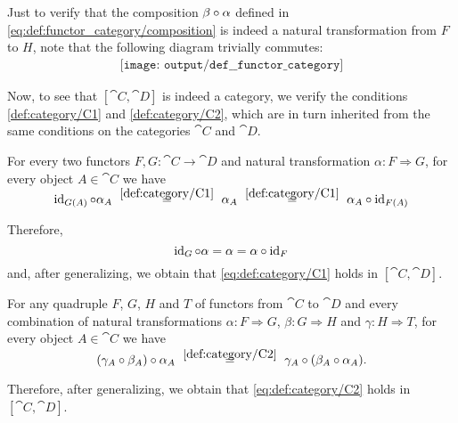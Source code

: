 \begin{defproof}
  Just to verify that the composition \( \beta \bincirc \alpha \) defined in \eqref{eq:def:functor_category/composition} is indeed a natural transformation from \( F \) to \( H \), note that the following diagram trivially commutes:
  \begin{equation}\label{def:functor_category/composition}
    \begin{aligned}
      \texttt{[image: output/def\_\_functor\_category]}
    \end{aligned}
  \end{equation}

  Now, to see that \( [\cat{C}, \cat{D}] \) is indeed a category, we verify the conditions \ref{def:category/C1} and \ref{def:category/C2}, which are in turn inherited from the same conditions on the categories \( \cat{C} \) and \( \cat{D} \).

   For every two functors \( F, G: \cat{C} \to \cat{D} \) and natural transformation \( \alpha: F \Rightarrow G \), for every object \( A \in \cat{C} \) we have
  \begin{equation*}
    \id_{G(A)} \bincirc \alpha_A
    \reloset{\eqref{def:category/C1}} =
    \alpha_A
    \reloset{\eqref{def:category/C1}} =
    \alpha_A \bincirc \id_{F(A)}
  \end{equation*}

  Therefore,
  \begin{equation*}
    \id_G \bincirc \alpha = \alpha = \alpha \bincirc \id_F
  \end{equation*}
  and, after generalizing, we obtain that \eqref{eq:def:category/C1} holds in \( [\cat{C}, \cat{D}] \).

   For any quadruple \( F \), \( G \), \( H \) and \( T \) of functors from \( \cat{C} \) to \( \cat{D} \) and every combination of natural transformations \( \alpha: F \Rightarrow G \), \( \beta: G \Rightarrow H \) and \( \gamma: H \Rightarrow T \), for every object \( A \in \cat{C} \) we have
  \begin{equation*}
    (\gamma_A \bincirc \beta_A) \bincirc \alpha_A
    \reloset{\eqref{def:category/C2}} =
    \gamma_A \bincirc (\beta_A \bincirc \alpha_A).
  \end{equation*}

  Therefore, after generalizing, we obtain that \eqref{eq:def:category/C2} holds in \( [\cat{C}, \cat{D}] \).
\end{defproof}

